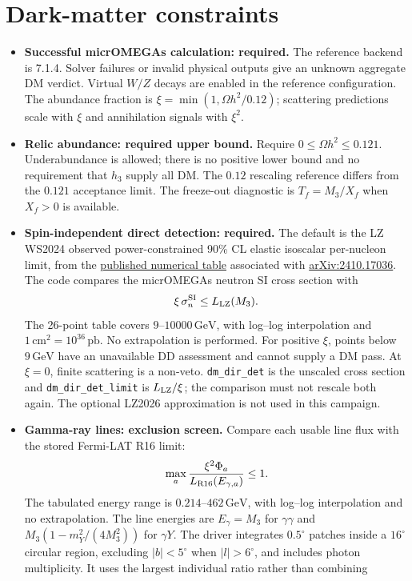 \documentclass[11pt,a4paper]{article}
\newcommand{\code}[1]{\ifmmode\mbox{\ttfamily\detokenize{#1}}\else\nolinkurl{#1}\fi}
\newcommand{\GeV}{\,\mathrm{GeV}}
\begin{document}
\section{Dark-matter constraints}
\begin{itemize}
\item \textbf{Successful micrOMEGAs calculation: required.} The reference
backend is 7.1.4. Solver failures or invalid physical outputs give an unknown
aggregate DM verdict. Virtual $W/Z$ decays are enabled in the reference
configuration. The abundance fraction is
$\xi=\min(1,\Omega h^2/0.12)$; scattering predictions scale with $\xi$ and
annihilation signals with $\xi^2$.
\item \textbf{Relic abundance: required upper bound.}
Require $0\leq\Omega h^2\leq0.121$. Underabundance is allowed; there is no
positive lower bound and no requirement that $h_3$ supply all DM.
The $0.12$ rescaling reference differs from the $0.121$ acceptance limit.
The freeze-out diagnostic is $T_f=M_3/X_f$ when $X_f>0$ is available.
\item \textbf{Spin-independent direct detection: required.}
The default is the LZ WS2024 observed power-constrained 90\% CL elastic
isoscalar per-nucleon limit, from the
\href{https://doi.org/10.17182/hepdata.155182.v2/t1}{published numerical table}
associated with \href{https://arxiv.org/abs/2410.17036}{arXiv:2410.17036}.
The code compares the micrOMEGAs neutron SI cross section with
\[
 \xi\,\sigma_n^{\rm SI}\leq L_{\rm LZ}(M_3).
\]
The 26-point table covers $9$--$10000\GeV$, with log--log interpolation
and $1\,\mathrm{cm}^2=10^{36}\,\mathrm{pb}$. No extrapolation is performed.
For positive $\xi$, points below $9\GeV$ have an unavailable DD assessment
and cannot supply a DM pass. At $\xi=0$, finite scattering is a non-veto.
\code{dm_dir_det} is the unscaled cross section and
\code{dm_dir_det_limit} is $L_{\rm LZ}/\xi$; the comparison must not rescale
both again. The optional LZ2026 approximation is not used in this campaign.
\item \textbf{Gamma-ray lines: exclusion screen.} Compare each usable
line flux with the stored Fermi-LAT R16 limit:
\[
 \max_a\frac{\xi^2\Phi_a}{L_{\rm R16}(E_{\gamma,a})}\leq1.
\]
The tabulated energy range is $0.214$--$462\GeV$, with log--log
interpolation and no extrapolation. The line energies are $E_\gamma=M_3$
for $\gamma\gamma$ and $M_3(1-m_Y^2/(4M_3^2))$ for $\gamma Y$.
The driver integrates $0.5^\circ$ patches inside a $16^\circ$ circular
region, excluding $|b|<5^\circ$ when $|l|>6^\circ$, and includes photon
multiplicity. It uses the largest individual ratio rather than combining

\end{itemize}
\end{document}
